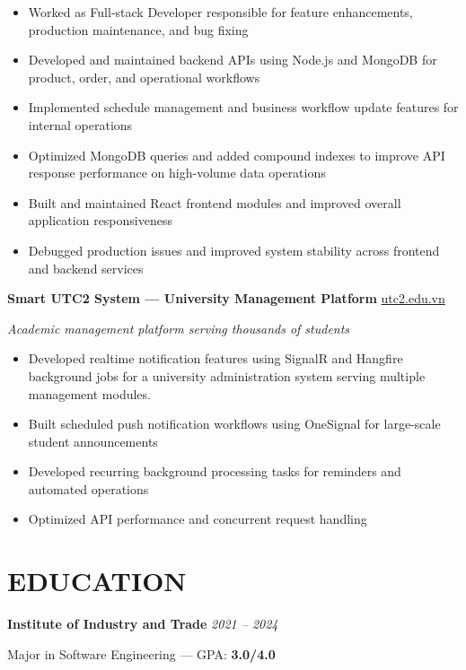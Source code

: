 \documentclass[11pt,a4paper]{article}
\begin{document}
\begin{itemize}

\item Worked as Full-stack Developer responsible for feature enhancements, production maintenance, and bug fixing

\item Developed and maintained backend APIs using Node.js and MongoDB for product, order, and operational workflows

\item Implemented schedule management and business workflow update features for internal operations

\item Optimized MongoDB queries and added compound indexes to improve API response performance on high-volume data operations

\item Built and maintained React frontend modules and improved overall application responsiveness

\item Debugged production issues and improved system stability across frontend and backend services

\end{itemize}




\textbf{Smart UTC2 System --- University Management Platform}
\hfill
{\small\color{muted}\href{https://utc2.edu.vn/}{utc2.edu.vn}}

{\small\color{muted}\textit{Academic management platform serving thousands of students}}

\begin{itemize}

\item Developed realtime notification features using SignalR and Hangfire background jobs for a university administration system serving multiple management modules.

\item Built scheduled push notification workflows using OneSignal for large-scale student announcements

\item Developed recurring background processing tasks for reminders and automated operations

\item Optimized API performance and concurrent request handling

\end{itemize}

\section*{EDUCATION}

\textbf{Institute of Industry and Trade}
\hfill
\textit{2021 -- 2024}

Major in Software Engineering --- GPA: \textbf{3.0/4.0}
\end{document}
